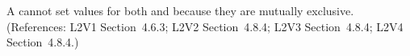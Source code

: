 A \Species cannot set values for both  and
 because they are mutually exclusive.  (References:
L2V1 Section~4.6.3; L2V2 Section~4.8.4; L2V3 Section~4.8.4; L2V4 Section~4.8.4.)
